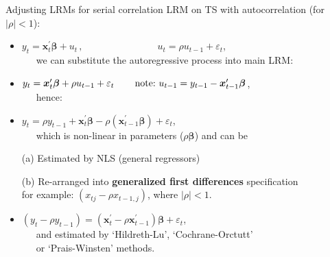 \documentclass{beamer}
\begin{document}
\begin{frame}{Adjusting LRMs for serial correlation}
LRM on TS with autocorrelation (for $|\rho|<1$):\\ \medskip
\begin{itemize}
    \item $y_t=\bm{x}_t^{\prime} \bm{\beta} + u_t \,,\qquad \qquad \qquad~~~~~~~\, u_t = \rho u_{t-1}+\varepsilon_t$,\\ \medskip
    ~~~we can substitute the autoregressive process into main LRM:\\ \bigskip
    \item $y_t=\bm{x}_t^{\prime} \bm{\beta} +\rho u_{t-1}+\varepsilon_t \, \qquad \textnormal{note:~} u_{t-1} = y_{t-1} - \bm{x}_{t-1}^{\prime} \bm{\beta} $, \\ \medskip ~~~hence: \\ \medskip
    \item $y_t= \rho y_{t-1} + \bm{x}_t^{\prime} \bm{\beta} - \rho (\bm{x}_{t-1}^{\prime} \bm{\beta}) + \varepsilon_t$, \\ \medskip 
    ~~~which is non-linear in parameters ($\rho \bm{\beta}$) and can be \\ \medskip
    \item[(a)] Estimated by NLS (general regressors)\\ \medskip
    \item[(b)] Re-arranged into \textbf{generalized first differences} specification \\
    for example: $(x_{tj}-\rho x_{t-1,j})$, where $|\rho|<1$.\\ \medskip
    \item $(y_t - \rho y_{t-1}) =  ( \bm{x}_t^{\prime} - \rho \bm{x}_{t-1}^{\prime}) \bm{\beta} + \varepsilon_t$,\\ \medskip
    ~~~and estimated by `Hildreth-Lu', `Cochrane-Orctutt' \\ 
    ~~~or `Prais-Winsten' methods.
\end{itemize}
\end{frame}
\end{document}
